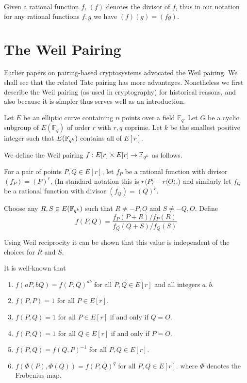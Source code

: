 Given a rational function $f$,
$(f)$ denotes the divisor of $f$, thus in our notation
for any rational functions $f, g$ we have $(f)(g) = (f g)$.

\section {The Weil Pairing}

Earlier papers on pairing-based cryptosystems advocated the Weil pairing.
We shall see that the related Tate pairing has more advantages.
Nonetheless we first describe the Weil pairing (as used in cryptography)
for historical reasons, and also because it is simpler thus
serves well as an introduction.

Let $E$ be an elliptic curve containing $n$ points over a field $\mathbb{F}_q$.
Let $G$ be a cyclic subgroup of $E(\mathbb{F}_q)$ of order $r$ with $r, q$
coprime. Let $k$ be the smallest positive integer such that $E(\mathbb{F}_{q^k})$
contains all of $E[r]$.

We define the Weil pairing
$f:E[r] \times E[r] \rightarrow \mathbb{F}_{q^k}$ as follows.

For a pair of points $P, Q \in E[r]$,
let $f_P$ be a rational function with divisor $(f_P) = (P)^r$,
(In standard notation this is $r\langle P\rangle  - r\langle O\rangle$.)
and similarly let $f_Q$ be a rational function with divisor $(f_Q) = (Q)^r$.

Choose any $R, S \in E(\mathbb{F}_{q^k})$ such that $R \ne -P, O$ and $S \ne -Q, O$.
Define
\[ f(P,Q) = \frac{f_P(P+R)/f_P(R)}{f_Q(Q+S)/f_Q(S)} \]

Using Weil reciprocity it can be shown that this value is independent
of the choices for $R$ and $S$.

It is well-known that
\begin{enumerate}
\item
$f(a P, b Q) = f(P,Q)^{a b}$ for all $P, Q \in E[r]$ and all integers $a, b$.
\item
$f(P,P) = 1$ for all $P \in E[r]$.
\item
$f(P,Q) = 1$ for all $P \in E[r]$ if and only if $Q = O$.
\item
$f(P,Q) = 1$ for all $Q \in E[r]$ if and only if $P = O$.
\item
$f(P,Q) = f(Q,P)^{-1}$ for all $P,Q \in E[r]$.
\item
$f(\Phi(P),\Phi(Q)) = f(P,Q)^{q}$ for all $P,Q \in E[r]$.
where $\Phi$ denotes the Frobenius map.
\end{enumerate}

